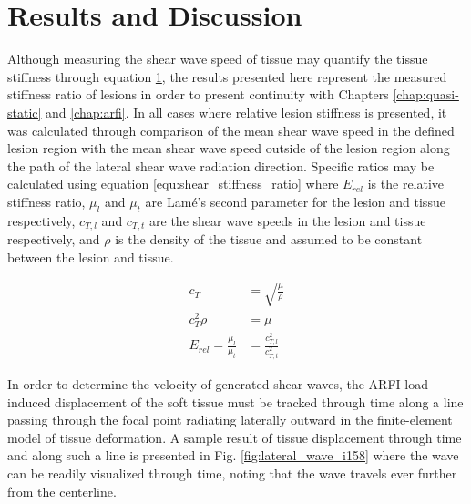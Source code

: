 	\section{Results and Discussion}
		Although measuring the shear wave speed of tissue may quantify the tissue stiffness through equation \ref{}, the results presented here represent the measured stiffness ratio of lesions in order to present continuity with Chapters \ref{chap:quasi-static} and \ref{chap:arfi}. In all cases where relative lesion stiffness is presented, it was calculated through comparison of the mean shear wave speed in the defined lesion region with the mean shear wave speed outside of the lesion region along the path of the lateral shear wave radiation direction. Specific ratios may be calculated using equation \ref{equ:shear_stiffness_ratio} where $E_{rel}$ is the relative stiffness ratio, $\mu_l$ and $\mu_t$ are Lam\'{e}'s second parameter for the lesion and tissue respectively, $c_{T,l}$ and $c_{T,t}$ are the shear wave speeds in the lesion and tissue respectively, and $\rho$ is the density of the tissue and assumed to be constant between the lesion and tissue.

		\begin{subequations}
			\label{equ:shear_stiffness_ratio}
			\begin{align}
				c_T &= \sqrt{\frac{\mu}{\rho}} \\
				c_T^2\rho &= \mu \\
				E_{rel} = \frac{\mu_l}{\mu_t} &= \frac{c_{T,l}^2}{c_{T,t}^2}
			\end{align}
		\end{subequations}

		In order to determine the velocity of generated shear waves, the ARFI load-induced displacement of the soft tissue must be tracked through time along a line passing through the focal point radiating laterally outward in the finite-element model of tissue deformation. A sample result of tissue displacement through time and along such a line is presented in Fig. \ref{fig:lateral_wave_i158} where the wave can be readily visualized through time, noting that the wave travels ever further from the centerline.

